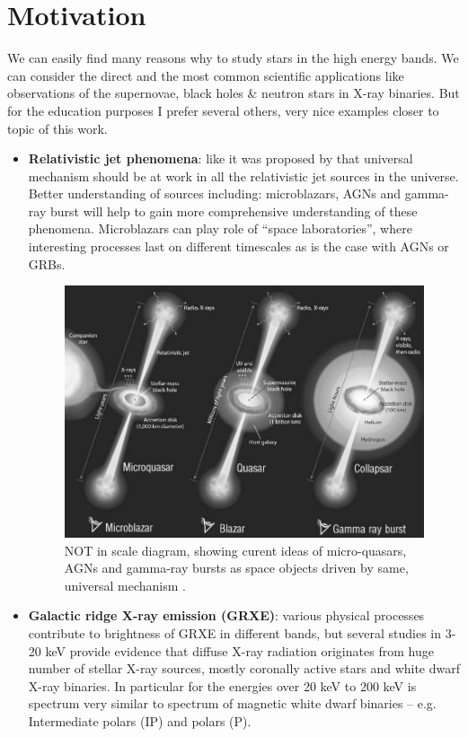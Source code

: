 \documentclass[oneside,a4paper,11pt]{report}
\begin{document}
\section{Motivation}
We can easily find many reasons why to study stars in the high energy bands.  
We can consider the direct and the most common scientific applications like observations of 
the supernovae, black holes \& neutron stars in X-ray binaries. But for the education purposes 
I prefer several others, very nice examples closer to topic of this work.  

\begin{itemize}
 \item \textbf{Relativistic jet phenomena}: like it was proposed by \citet{mirabel:1} that universal 
mechanism should be at work in all the relativistic jet sources in the universe. Better understanding 
of sources including: microblazars, AGNs and gamma-ray burst will help to gain more comprehensive 
understanding of these phenomena. Microblazars can play role of “space laboratories”, where interesting
 processes last on different timescales as is the case with AGNs or GRBs.   

\begin{figure}[!hbt]
\centering
\includegraphics[totalheight=8.5cm]{microblazars}
\caption{NOT in scale diagram, showing curent ideas of micro-quasars, AGNs and gamma-ray
bursts as space objects driven by same, universal mechanism  \citet{mirabel:1}. }
\label{microblazar} 
\end{figure}

 \item \textbf{Galactic ridge X-ray emission (GRXE)}: various physical processes contribute to 
brightness of GRXE in different bands, but several studies in 3-20 keV provide evidence that diffuse 
X-ray radiation originates from huge number of stellar X-ray sources, mostly coronally active stars
 and white dwarf X-ray binaries. In particular for the energies over 20 keV to 200 keV is spectrum 
very similar to spectrum  of magnetic white dwarf binaries – e.g. Intermediate polars (IP) and polars (P).  
\citet{2007A&A...463..957K}
 

\end{itemize}
\end{document}
